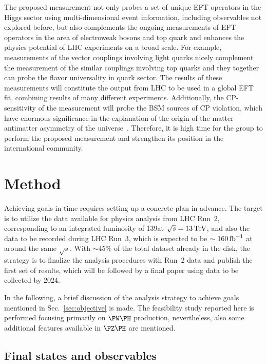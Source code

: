 \documentclass[a4paper,11pt]{article}
\begin{document}
The proposed measurement not only probes a set of unique EFT operators in the Higgs sector using multi-dimensional event information, including observables not explored before, 
but also complements the ongoing measurements of EFT operators in the area of electroweak bosons and top quark and enhances the physics potential of LHC experiments on a broad scale. 
For example, measurements of the vector couplings involving light quarks nicely complement the measurement of the similar couplings involving top quarks and they together can probe the flavor universality in quark sector.
The results of these measurements will constitute the output from LHC to be used in a global EFT fit, combining results of many different experiments.
Additionally, the CP-sensitivity of the measurement will probe the BSM sources of CP violation, 
which have enormous significance in the explanation of the origin of the matter-antimatter asymmetry of the universe~\cite{Cohen:1997ac,Damgaard:2015con,Grzadkowski:2018nbc}.
Therefore, it is high time for the group to perform the proposed measurement and strengthen its position in the international community. 

\section{Method}
\label{sec:method}

Achieving goals in time requires setting up a concrete plan in advance. 
The target is to utilize the data available for physics analysis from LHC Run~2, corresponding to an integrated luminosity of 139\fbinv at $\sqrt{s}=13\,\text{Te\hspace{-.08em}V}$, and also the data to be recorded during LHC Run~3, which is expected to be $\sim 160\mbox{\ensuremath{\,\text{fb}^{-1}}}$ at around the same $\sqrt{s}$. 
With $\sim 45\%$ of the total dataset already in the disk, the strategy is to finalize the analysis procedures with Run~2 data and publish the first set of results, which will be followed by a final paper using data to be collected by 2024. 

In the following, a brief discussion of the analysis strategy to achieve goals mentioned in Sec.~\ref{sec:objective} is made. The feasibility study reported here is performed focusing primarily on $\PW\PH$ production, 
nevertheless, also some additional features available in $\PZ\PH$ are mentioned. 

\subsection{Final states and observables}
\end{document}
